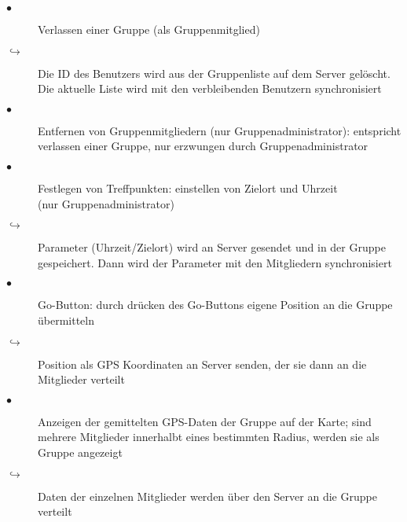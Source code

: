 \begin{description}
\item[$\bullet$] Verlassen einer Gruppe (als Gruppenmitglied)
\item[$\hookrightarrow$] Die ID des Benutzers wird aus der Gruppenliste auf dem Server gelöscht. Die aktuelle Liste wird mit den verbleibenden Benutzern synchronisiert
\item[$\bullet$] Entfernen von Gruppenmitgliedern (nur Gruppenadministrator): entspricht verlassen einer Gruppe, nur erzwungen durch Gruppenadministrator
\item[$\bullet$] Festlegen von Treffpunkten: einstellen von Zielort und Uhrzeit\\(nur Gruppenadministrator)
\item[$\hookrightarrow$] Parameter (Uhrzeit/Zielort) wird an Server gesendet und in der Gruppe gespeichert. Dann wird der Parameter mit den Mitgliedern synchronisiert
\item[$\bullet$] Go-Button: durch drücken des Go-Buttons eigene Position an die Gruppe übermitteln
\item[$\hookrightarrow$] Position als GPS Koordinaten an Server senden, der sie dann an die Mitglieder verteilt
\item[$\bullet$] Anzeigen der gemittelten GPS-Daten der Gruppe auf der Karte; sind mehrere Mitglieder innerhalbt eines bestimmten Radius,
     werden sie als Gruppe angezeigt
\item[$\hookrightarrow$] Daten der einzelnen Mitglieder werden über den Server an die Gruppe verteilt
\end{description}
